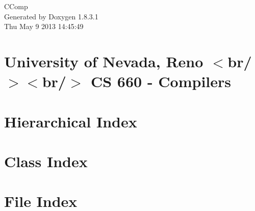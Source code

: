 \documentclass{book}
\begin{document}
\hypersetup{pageanchor=false,citecolor=blue}
\begin{titlepage}
\vspace*{7cm}
\begin{center}
{\Large C\-Comp }\\
\vspace*{1cm}
{\large Generated by Doxygen 1.8.3.1}\\
\vspace*{0.5cm}
{\small Thu May 9 2013 14:45:49}\\
\end{center}
\end{titlepage}
\clearemptydoublepage
{}
\tableofcontents
\clearemptydoublepage
{}
\hypersetup{pageanchor=true,citecolor=blue}
\chapter{University of Nevada, Reno $<$br/$>$$<$br/$>$ C\-S 660 -\/ Compilers}
\label{index}\hypertarget{index}{}
\chapter{Hierarchical Index}

\chapter{Class Index}

\chapter{File Index}

\end{document}
